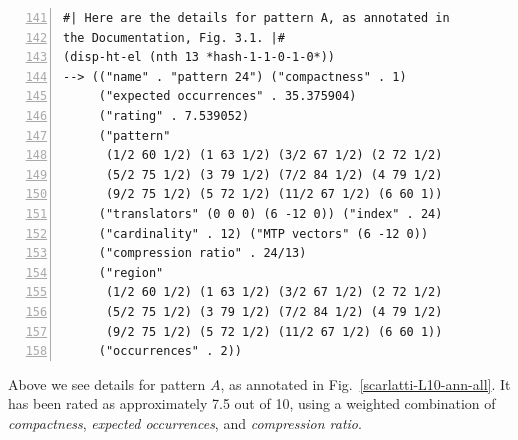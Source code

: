 \begin{Verbatim}[frame=single,numbers=left,firstnumber=141]
#| Here are the details for pattern A, as annotated in
the Documentation, Fig. 3.1. |#
(disp-ht-el (nth 13 *hash-1-1-0-1-0*))
--> (("name" . "pattern 24") ("compactness" . 1)
     ("expected occurrences" . 35.375904)
     ("rating" . 7.539052)
     ("pattern"
      (1/2 60 1/2) (1 63 1/2) (3/2 67 1/2) (2 72 1/2)
      (5/2 75 1/2) (3 79 1/2) (7/2 84 1/2) (4 79 1/2)
      (9/2 75 1/2) (5 72 1/2) (11/2 67 1/2) (6 60 1))
     ("translators" (0 0 0) (6 -12 0)) ("index" . 24)
     ("cardinality" . 12) ("MTP vectors" (6 -12 0))
     ("compression ratio" . 24/13)
     ("region"
      (1/2 60 1/2) (1 63 1/2) (3/2 67 1/2) (2 72 1/2)
      (5/2 75 1/2) (3 79 1/2) (7/2 84 1/2) (4 79 1/2)
      (9/2 75 1/2) (5 72 1/2) (11/2 67 1/2) (6 60 1))
     ("occurrences" . 2))
\end{Verbatim}
Above we see details for pattern $A$, as annotated in Fig.~\ref{scarlatti-L10-ann-all}. It has been rated as approximately 7.5 out of 10, using a weighted combination of \emph{compactness}, \emph{expected occurrences}, and \emph{compression ratio}.

